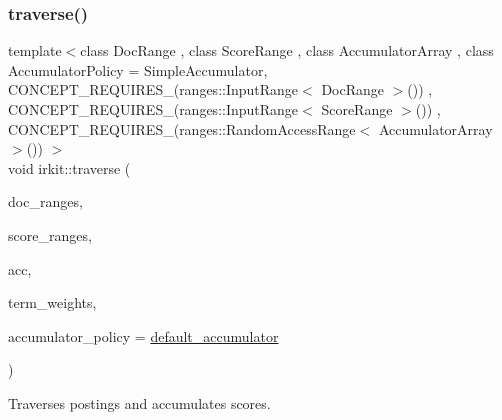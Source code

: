 \subsubsection{\texorpdfstring{traverse()}{traverse()}}
{\footnotesize\ttfamily template$<$class Doc\+Range , class Score\+Range , class Accumulator\+Array , class Accumulator\+Policy  = Simple\+Accumulator, C\+O\+N\+C\+E\+P\+T\+\_\+\+R\+E\+Q\+U\+I\+R\+E\+S\+\_\+(ranges\+::\+Input\+Range$<$ Doc\+Range $>$()) , C\+O\+N\+C\+E\+P\+T\+\_\+\+R\+E\+Q\+U\+I\+R\+E\+S\+\_\+(ranges\+::\+Input\+Range$<$ Score\+Range $>$()) , C\+O\+N\+C\+E\+P\+T\+\_\+\+R\+E\+Q\+U\+I\+R\+E\+S\+\_\+(ranges\+::\+Random\+Access\+Range$<$ Accumulator\+Array $>$()) $>$ \\
void irkit\+::traverse (\begin{DoxyParamCaption}\item[{const std\+::vector$<$ Doc\+Range $>$ \&}]{doc\+\_\+ranges,  }\item[{const std\+::vector$<$ Score\+Range $>$ \&}]{score\+\_\+ranges,  }\item[{Accumulator\+Array \&}]{acc,  }\item[{const std\+::vector$<$ \hyperlink{namespaceirkit_afcffab67300c5c703cb38a363c9a6f1d}{pure\+\_\+element\+\_\+t}$<$ Score\+Range $>$$>$ \&}]{term\+\_\+weights,  }\item[{Accumulator\+Policy \&}]{accumulator\+\_\+policy = {\ttfamily \hyperlink{namespaceirkit_a823671564bf545991e9708011e4a8df1}{default\+\_\+accumulator}} }\end{DoxyParamCaption})}



Traverses postings and accumulates scores. 

\mbox{\label{namespaceirkit_a4c79a79ea1508257bcf4eaaf615e2f9a}} 
